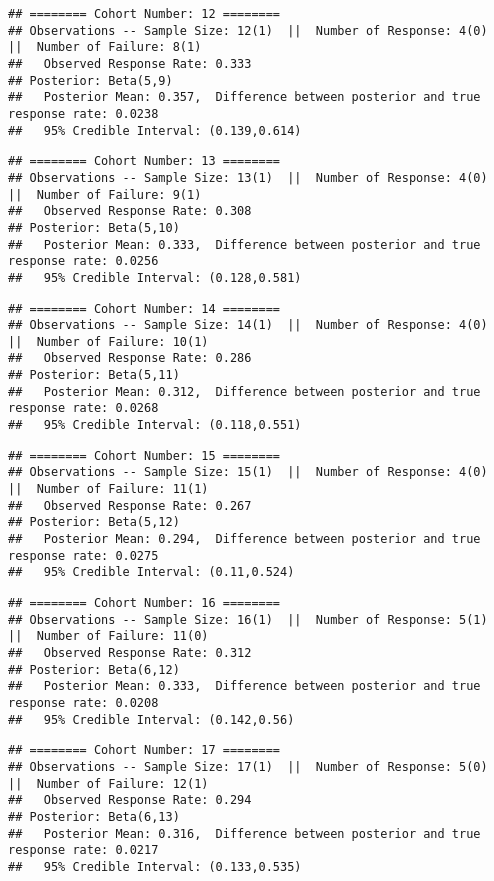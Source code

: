 \documentclass[]{article}
\begin{document}
\begin{verbatim}
## ======== Cohort Number: 12 ======== 
## Observations -- Sample Size: 12(1)  ||  Number of Response: 4(0)  ||  Number of Failure: 8(1)
##   Observed Response Rate: 0.333
## Posterior: Beta(5,9) 
##   Posterior Mean: 0.357,  Difference between posterior and true response rate: 0.0238
##   95% Credible Interval: (0.139,0.614)
\end{verbatim}

\begin{verbatim}
## ======== Cohort Number: 13 ======== 
## Observations -- Sample Size: 13(1)  ||  Number of Response: 4(0)  ||  Number of Failure: 9(1)
##   Observed Response Rate: 0.308
## Posterior: Beta(5,10) 
##   Posterior Mean: 0.333,  Difference between posterior and true response rate: 0.0256
##   95% Credible Interval: (0.128,0.581)
\end{verbatim}

\begin{verbatim}
## ======== Cohort Number: 14 ======== 
## Observations -- Sample Size: 14(1)  ||  Number of Response: 4(0)  ||  Number of Failure: 10(1)
##   Observed Response Rate: 0.286
## Posterior: Beta(5,11) 
##   Posterior Mean: 0.312,  Difference between posterior and true response rate: 0.0268
##   95% Credible Interval: (0.118,0.551)
\end{verbatim}

\begin{verbatim}
## ======== Cohort Number: 15 ======== 
## Observations -- Sample Size: 15(1)  ||  Number of Response: 4(0)  ||  Number of Failure: 11(1)
##   Observed Response Rate: 0.267
## Posterior: Beta(5,12) 
##   Posterior Mean: 0.294,  Difference between posterior and true response rate: 0.0275
##   95% Credible Interval: (0.11,0.524)
\end{verbatim}

\begin{verbatim}
## ======== Cohort Number: 16 ======== 
## Observations -- Sample Size: 16(1)  ||  Number of Response: 5(1)  ||  Number of Failure: 11(0)
##   Observed Response Rate: 0.312
## Posterior: Beta(6,12) 
##   Posterior Mean: 0.333,  Difference between posterior and true response rate: 0.0208
##   95% Credible Interval: (0.142,0.56)
\end{verbatim}

\begin{verbatim}
## ======== Cohort Number: 17 ======== 
## Observations -- Sample Size: 17(1)  ||  Number of Response: 5(0)  ||  Number of Failure: 12(1)
##   Observed Response Rate: 0.294
## Posterior: Beta(6,13) 
##   Posterior Mean: 0.316,  Difference between posterior and true response rate: 0.0217
##   95% Credible Interval: (0.133,0.535)
\end{verbatim}
\end{document}

